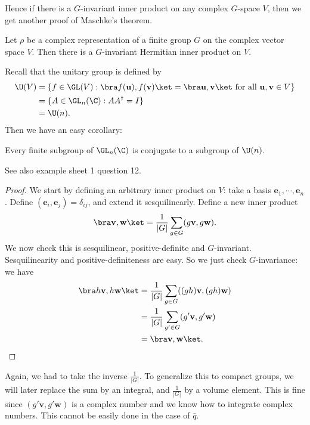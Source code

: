 \documentclass[a4paper]{article}
\begin{document}
Hence if there is a $G$-invariant inner product on any complex $G$-space $V$, then we get another proof of Maschke's theorem.
\begin{thm}
  Let $\rho$ be a complex representation of a finite group $G$ on the complex vector space $V$. Then there is a $G$-invariant Hermitian inner product on $V$.
\end{thm}

Recall that the unitary group is defined by
\begin{align*}
  \U(V) &= \{f \in \GL(V): \bra f(\mathbf{u}), f(\mathbf{v})\ket = \bra \mathbf{u}, \mathbf{v}\ket \text{ for all }\mathbf{u}, \mathbf{v} \in V\}\\
  &= \{A \in \GL_n(\C): AA^\dagger = I\}\\
  &= \U(n).
\end{align*}
Then we have an easy corollary:
\begin{cor}
  Every finite subgroup of $\GL_n(\C)$ is conjugate to a subgroup of $\U(n)$.
\end{cor}
See also example sheet 1 question 12.

\begin{proof}
  We start by defining an arbitrary inner product on $V$: take a basis $\mathbf{e}_1, \cdots, \mathbf{e}_n$. Define $(\mathbf{e}_i, \mathbf{e}_j) = \delta_{ij}$, and extend it sesquilinearly. Define a new inner product
  \[
    \bra \mathbf{v}, \mathbf{w}\ket = \frac{1}{|G|} \sum_{g \in G} (g\mathbf{v}, g\mathbf{w}).
  \]
  We now check this is sesquilinear, positive-definite and $G$-invariant. Sesquilinearity and positive-definiteness are easy. So we just check $G$-invariance: we have
  \begin{align*}
    \bra h\mathbf{v}, h\mathbf{w}\ket &= \frac{1}{|G|} \sum_{g \in G} ((gh)\mathbf{v}, (gh)\mathbf{w})\\
    &= \frac{1}{|G|} \sum_{g' \in G} (g' \mathbf{v}, g' \mathbf{w})\\
    &= \bra \mathbf{v}, \mathbf{w}\ket.
  \end{align*}
\end{proof}
Again, we had to take the inverse $\frac{1}{|G|}$. To generalize this to compact groups, we will later replace the sum by an integral, and $\frac{1}{|G|}$ by a volume element. This is fine since $(g' \mathbf{v}, g'\mathbf{w})$ is a complex number and we know how to integrate complex numbers. This cannot be easily done in the case of $\bar{q}$.
\end{document}

